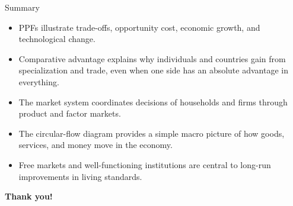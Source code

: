 \documentclass[aspectratio=169]{beamer}
\begin{document}
\begin{frame}{Summary}
\transfade
\begin{itemize}
  \item PPFs illustrate trade-offs, opportunity cost, economic growth, and technological change.
  \item Comparative advantage explains why individuals and countries gain from specialization and trade, even when one side has an absolute advantage in everything.
  \item The market system coordinates decisions of households and firms through product and factor markets.
  \item The circular-flow diagram provides a simple macro picture of how goods, services, and money move in the economy.
  \item Free markets and well-functioning institutions are central to long-run improvements in living standards.
\end{itemize}
\end{frame}

\begin{frame}
\centering
\Huge \textbf{Thank you!}
\end{frame}
\end{document}
